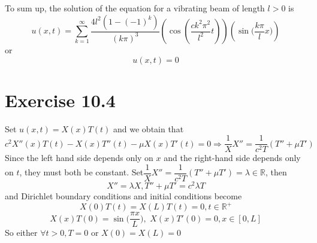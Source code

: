 \documentclass[a4paper,12pt,titlepage]{article}
\begin{document}
To sum up, the solution of the equation for a vibrating beam of length $l > 0$ is
$$u(x,t)=\sum\limits_{k=1}^{\infty}\dfrac{4l^2(1-(-1)^k)}{(k\pi)^3}(\cos(\frac{ck^2\pi^2}{l^2}t))(\sin\Big(\dfrac{k\pi}{l}x\Big))$$
or
$$u(x,t)=0$$
\section*{Exercise 10.4}
Set $u(x,t)=X(x)T(t)$ and we obtain that
$$c^2X''(x)T(t)-X(x)T''(t)-\mu X(x)T'(t)=0\Rightarrow \dfrac{1}{X}X''=\dfrac{1}{c^2T}(T''+\mu T')$$
Since the left hand side depends only on $x$ and the right-hand side depends only on $t$, they must both be constant. Set$\dfrac{1}{X}X''=\dfrac{1}{c^2T}(T''+\mu T')=\lambda\in\mathbb{R}$, then
$$X''=\lambda X, T''+\mu T'=c^2\lambda T$$
and Dirichlet boundary conditions and initial conditions become
$$X(0)T(t)=X(L)T(t)=0,t\in\mathbb{R}^+$$
$$X(x)T(0)=\sin\Big(\dfrac{\pi x}{L}\Big),\,\,X(x)T'(0)=0,x\in[0,L]$$
So either $\forall t>0, T=0$ or $X(0)=X(L)=0$
\end{document}
